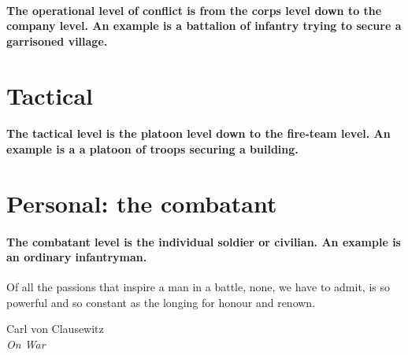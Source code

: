       \paragraph{The operational level of conflict is from the corps level down to the company level. An example is a battalion of infantry trying to secure a garrisoned village.}
    \section{Tactical}
      \paragraph{The tactical level is the platoon level down to the fire-team level. An example is a a platoon of troops securing a building.}
    \section{Personal: the combatant}
      \paragraph{The combatant level is the individual soldier or civilian. An example is an ordinary infantryman.}
      \epigraph{Of all the passions that inspire a man in a battle, none, we have to admit, is so powerful and so constant as the longing for honour and renown.}{Carl von Clausewitz\\ \textit{On War}}